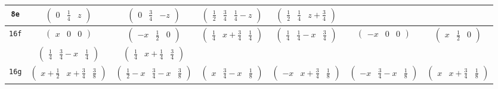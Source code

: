 \documentclass[fleqn,9pt,landscape]{jsarticle}
\begin{document}
\begin{center}
\begin{longtable}{ccccccc}
{\tt 8e} & $ \begin{pmatrix} 0 & \frac{1}{4} & z \end{pmatrix} $ & $ \begin{pmatrix} 0 & \frac{3}{4} & - z \end{pmatrix} $ & $ \begin{pmatrix} \frac{1}{2} & \frac{3}{4} & \frac{1}{4} - z \end{pmatrix} $ & $ \begin{pmatrix} \frac{1}{2} & \frac{1}{4} & z + \frac{3}{4} \end{pmatrix} $ & $  $ & $  $ \\ \hline
{\tt 16f} & $ \begin{pmatrix} x & 0 & 0 \end{pmatrix} $ & $ \begin{pmatrix} - x & \frac{1}{2} & 0 \end{pmatrix} $ & $ \begin{pmatrix} \frac{1}{4} & x + \frac{3}{4} & \frac{1}{4} \end{pmatrix} $ & $ \begin{pmatrix} \frac{1}{4} & \frac{1}{4} - x & \frac{3}{4} \end{pmatrix} $ & $ \begin{pmatrix} - x & 0 & 0 \end{pmatrix} $ & $ \begin{pmatrix} x & \frac{1}{2} & 0 \end{pmatrix} $ \\
& $ \begin{pmatrix} \frac{1}{4} & \frac{3}{4} - x & \frac{1}{4} \end{pmatrix} $ & $ \begin{pmatrix} \frac{1}{4} & x + \frac{1}{4} & \frac{3}{4} \end{pmatrix} $ & $  $ & $  $ & $  $ & $  $ \\ \hline
{\tt 16g} & $ \begin{pmatrix} x + \frac{1}{2} & x + \frac{3}{4} & \frac{3}{8} \end{pmatrix} $ & $ \begin{pmatrix} \frac{1}{2} - x & \frac{3}{4} - x & \frac{3}{8} \end{pmatrix} $ & $ \begin{pmatrix} x & \frac{3}{4} - x & \frac{1}{8} \end{pmatrix} $ & $ \begin{pmatrix} - x & x + \frac{3}{4} & \frac{1}{8} \end{pmatrix} $ & $ \begin{pmatrix} - x & \frac{3}{4} - x & \frac{1}{8} \end{pmatrix} $ & $ \begin{pmatrix} x & x + \frac{3}{4} & \frac{1}{8} \end{pmatrix} $ \\

\end{longtable}
\end{center}
\end{document}
